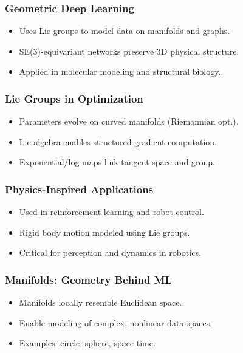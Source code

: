 \begin{frame}[fragile]\frametitle{Geometric Deep Learning}
  \begin{itemize}
    \item Uses Lie groups to model data on manifolds and graphs.
    \item SE(3)-equivariant networks preserve 3D physical structure.
    \item Applied in molecular modeling and structural biology.
  \end{itemize}
\end{frame}

\begin{frame}[fragile]\frametitle{Lie Groups in Optimization}
  \begin{itemize}
    \item Parameters evolve on curved manifolds (Riemannian opt.).
    \item Lie algebra enables structured gradient computation.
    \item Exponential/log maps link tangent space and group.
  \end{itemize}
\end{frame}

\begin{frame}[fragile]\frametitle{Physics-Inspired Applications}
  \begin{itemize}
    \item Used in reinforcement learning and robot control.
    \item Rigid body motion modeled using Lie groups.
    \item Critical for perception and dynamics in robotics.
  \end{itemize}
\end{frame}

\begin{frame}[fragile]\frametitle{Manifolds: Geometry Behind ML}
  \begin{itemize}
    \item Manifolds locally resemble Euclidean space.
    \item Enable modeling of complex, nonlinear data spaces.
    \item Examples: circle, sphere, space-time.
  \end{itemize}
\end{frame}

